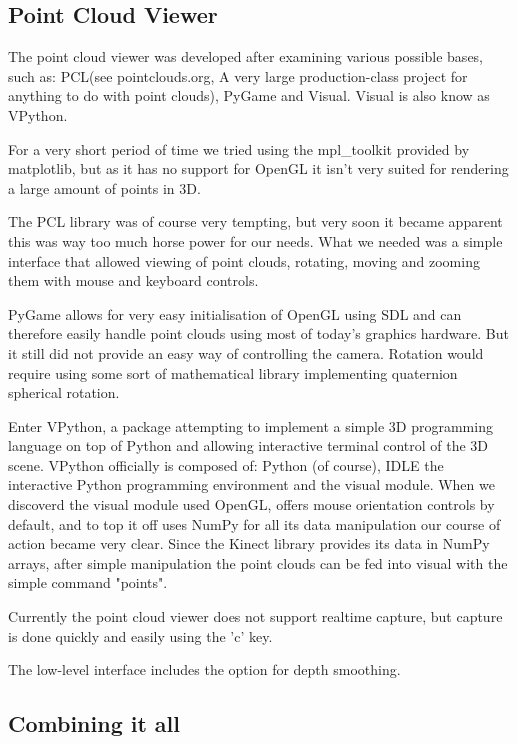 \subsection{Point Cloud Viewer}

The point cloud viewer was developed after examining various possible
bases, such as: PCL(see pointclouds.org, A very large production-class project for
anything to do with point clouds), PyGame and Visual. Visual is also know
as VPython.

For a very short period of time we tried using the mpl\_toolkit provided
by matplotlib, but as it has no support for OpenGL it isn't very suited
for rendering a large amount of points in 3D.

The PCL library was of course
very tempting, but very soon it became apparent this was way too much horse
power for our needs. What we needed was a simple interface that allowed viewing
of point clouds, rotating, moving and zooming them with mouse and keyboard
controls.

PyGame allows for very easy initialisation of OpenGL using SDL and can therefore
easily handle point clouds using most of today's graphics hardware. But it still
did not provide an easy way of controlling the camera. Rotation would require
using some sort of mathematical library implementing quaternion spherical rotation.

Enter VPython, a package attempting to implement a simple 3D programming
language on top of Python and allowing interactive terminal control of the
3D scene. VPython officially is composed of: Python (of course), IDLE the
interactive Python programming environment and the visual module. When we
discoverd the visual module used OpenGL, offers mouse orientation
controls by default, and to top it off uses NumPy for all its data manipulation
our course of action became very clear. Since the Kinect library provides its
data in NumPy arrays, after simple manipulation the point clouds can be fed into
visual with the simple command "points".

Currently the point cloud viewer does not support realtime capture, but capture
is done quickly and easily using the 'c' key.

The low-level interface includes the option for depth smoothing.

\subsection{Combining it all}

